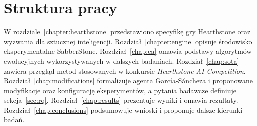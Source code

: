 \section{Struktura pracy}
W rozdziale~\ref{chapter:hearthstone} przedstawiono specyfikę gry Hearthstone oraz wyzwania dla sztucznej inteligencji. Rozdział~\ref{chapter:engine} opisuje środowisko eksperymentalne SabberStone. Rozdział~\ref{chap:ea} omawia podstawy algorytmów ewolucyjnych wykorzystywanych w dalszych badaniach. Rozdział~\ref{chap:sota} zawiera przegląd metod stosowanych w konkursie \textit{Hearthstone AI Competition}. Rozdział~\ref{chap:modifications} formalizuje agenta García-Sáncheza i proponowane modyfikacje oraz konfigurację eksperymentów, a pytania badawcze definiuje sekcja~\ref{sec:rq}. Rozdział~\ref{chap:results} prezentuje wyniki i omawia rezultaty. Rozdział~\ref{chap:conclusions} podsumowuje wnioski i proponuje dalsze kierunki badań.

